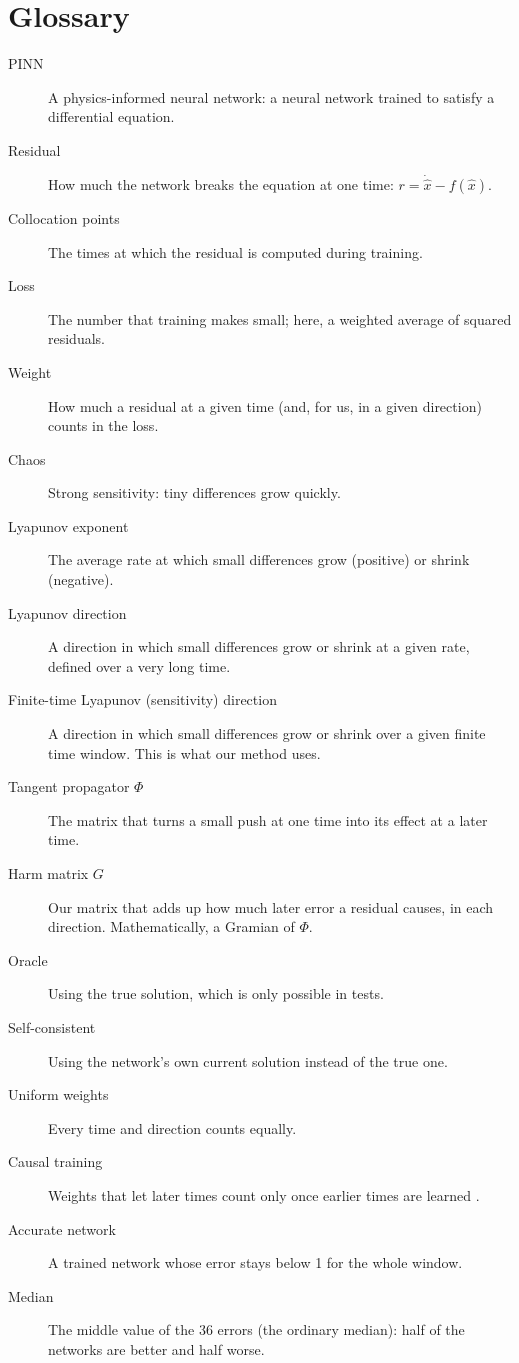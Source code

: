 \documentclass[11pt,a4paper]{article}
\begin{document}
\section{Glossary}
\begin{description}
\item[PINN] A physics-informed neural network: a neural network trained to satisfy a
  differential equation.
\item[Residual] How much the network breaks the equation at one time:
  $r=\dot{\hat x}-f(\hat x)$.
\item[Collocation points] The times at which the residual is computed during training.
\item[Loss] The number that training makes small; here, a weighted average of squared
  residuals.
\item[Weight] How much a residual at a given time (and, for us, in a given direction)
  counts in the loss.
\item[Chaos] Strong sensitivity: tiny differences grow quickly.
\item[Lyapunov exponent] The average rate at which small differences grow (positive) or
  shrink (negative).
\item[Lyapunov direction] A direction in which small differences grow or shrink at a given
  rate, defined over a very long time.
\item[Finite-time Lyapunov (sensitivity) direction] A direction in which small differences
  grow or shrink over a given finite time window. This is what our method uses.
\item[Tangent propagator $\Phi$] The matrix that turns a small push at one time into its
  effect at a later time.
\item[Harm matrix $G$] Our matrix that adds up how much later error a residual causes, in
  each direction. Mathematically, a Gramian of $\Phi$.
\item[Oracle] Using the true solution, which is only possible in tests.
\item[Self-consistent] Using the network's own current solution instead of the true one.
\item[Uniform weights] Every time and direction counts equally.
\item[Causal training] Weights that let later times count only once earlier times are
  learned \cite{wang2022}.
\item[Accurate network] A trained network whose error stays below 1 for the whole window.
\item[Median] The middle value of the 36 errors (the ordinary median): half of the networks
  are better and half worse.
\end{description}
\end{document}

